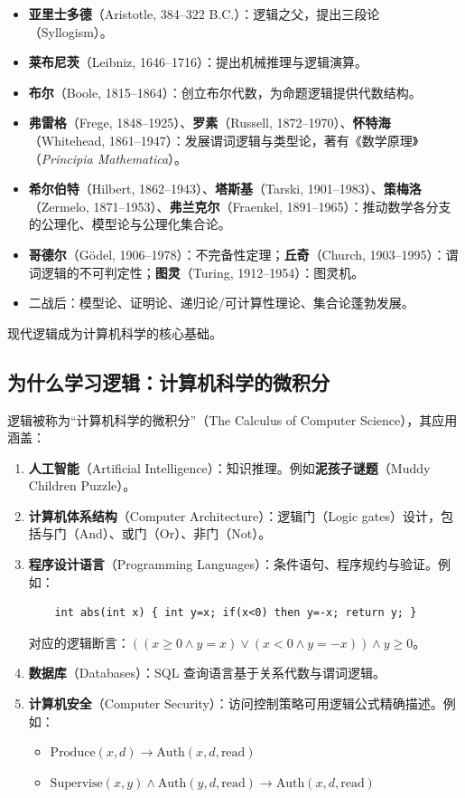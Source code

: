 \documentclass[UTF8,11pt,a4paper]{ctexbook}   %
\theoremstyle{definition}
\begin{document}
\begin{itemize}
    \item \textbf{亚里士多德}（Aristotle, 384--322 B.C.）：逻辑之父，提出三段论（Syllogism）。
    \item \textbf{莱布尼茨}（Leibniz, 1646--1716）：提出机械推理与逻辑演算。
    \item \textbf{布尔}（Boole, 1815--1864）：创立布尔代数，为命题逻辑提供代数结构。
    \item \textbf{弗雷格}（Frege, 1848--1925）、\textbf{罗素}（Russell, 1872--1970）、\textbf{怀特海}（Whitehead, 1861--1947）：发展谓词逻辑与类型论，著有《数学原理》（\textit{Principia Mathematica}）。
    \item \textbf{希尔伯特}（Hilbert, 1862--1943）、\textbf{塔斯基}（Tarski, 1901--1983）、\textbf{策梅洛}（Zermelo, 1871--1953）、\textbf{弗兰克尔}（Fraenkel, 1891--1965）：推动数学各分支的公理化、模型论与公理化集合论。
    \item \textbf{哥德尔}（Gödel, 1906--1978）：不完备性定理；\textbf{丘奇}（Church, 1903--1995）：谓词逻辑的不可判定性；\textbf{图灵}（Turing, 1912--1954）：图灵机。
    \item 二战后：模型论、证明论、递归论/可计算性理论、集合论蓬勃发展。
\end{itemize}

现代逻辑成为计算机科学的核心基础。

\subsection{为什么学习逻辑：计算机科学的微积分}

逻辑被称为``计算机科学的微积分''（The Calculus of Computer Science），其应用涵盖：

\begin{enumerate}
    \item \textbf{人工智能}（Artificial Intelligence）：知识推理。例如\textbf{泥孩子谜题}（Muddy Children Puzzle）。
    \item \textbf{计算机体系结构}（Computer Architecture）：逻辑门（Logic gates）设计，包括与门（And）、或门（Or）、非门（Not）。
    \item \textbf{程序设计语言}（Programming Languages）：条件语句、程序规约与验证。例如：
    \begin{verbatim}
    int abs(int x) { int y=x; if(x<0) then y=-x; return y; }
    \end{verbatim}
    对应的逻辑断言：$((x \geq 0 \land y=x) \lor (x<0 \land y=-x)) \land y \geq 0$。
    \item \textbf{数据库}（Databases）：SQL 查询语言基于关系代数与谓词逻辑。
    \item \textbf{计算机安全}（Computer Security）：访问控制策略可用逻辑公式精确描述。例如：
    \begin{itemize}
        \item $\text{Produce}(x, d) \rightarrow \text{Auth}(x, d, \text{read})$
        \item $\text{Supervise}(x, y) \land \text{Auth}(y, d, \text{read}) \rightarrow \text{Auth}(x, d, \text{read})$
    \end{itemize}
\end{enumerate}
\end{document}
